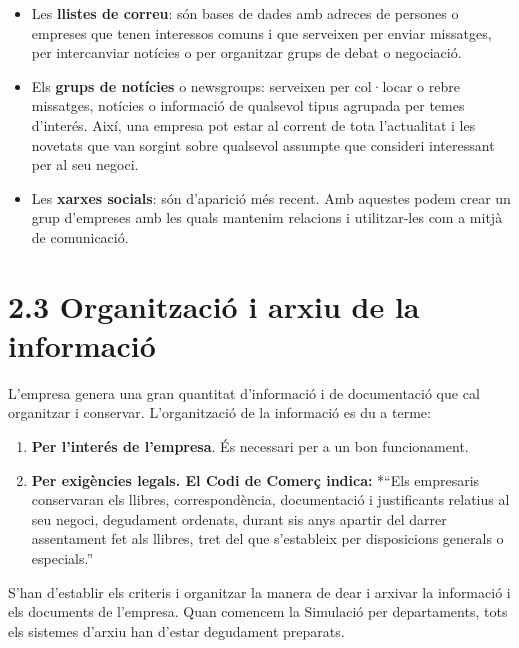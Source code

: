 \documentclass[
  a4paper,
  openany]{book}
\begin{document}
\begin{itemize}
\item
  Les \textbf{llistes de correu}: són bases de dades amb adreces de persones o empreses que tenen interessos comuns i que serveixen per enviar missatges, per intercanviar notícies o per organitzar grups de debat o negociació.
\item
  Els \textbf{grups de notícies} o newsgroups: serveixen per col·locar o rebre missatges, notícies o informació de qualsevol tipus agrupada per temes d'interés. Així, una empresa pot estar al corrent de tota l'actualitat i les novetats que van sorgint sobre qualsevol assumpte que consideri interessant per al seu negoci.
\item
  Les \textbf{xarxes socials}: són d'aparició més recent. Amb aquestes podem crear un grup d'empreses amb les quals mantenim relacions i utilitzar-les com a mitjà de comunicació.
\end{itemize}

\hypertarget{organitzaciuxf3-i-arxiu-de-la-informaciuxf3}{%
\section{2.3 Organització i arxiu de la informació}\label{organitzaciuxf3-i-arxiu-de-la-informaciuxf3}}

L'empresa genera una gran quantitat d'informació i de documentació que cal organitzar i conservar. L'organització de la informació es du a terme:

\begin{enumerate}
\def\labelenumi{\alph{enumi}.}
\item
  \textbf{Per l'interés de l'empresa}. És necessari per a un bon funcionament.
\item
  \textbf{Per exigències legals. El Codi de Comerç indica:} *``Els empresaris conservaran els llibres, correspondència, documentació i justificants relatius al seu negoci, degudament ordenats, durant sis anys apartir del darrer assentament fet als llibres, tret del que s'estableix per disposicions generals o especials.''
\end{enumerate}

S'han d'establir els criteris i organitzar la manera de dear i arxivar la informació i els documents de l'empresa. Quan comencem la Simulació per departaments, tots els sistemes d'arxiu han d'estar degudament preparats.
\end{document}

